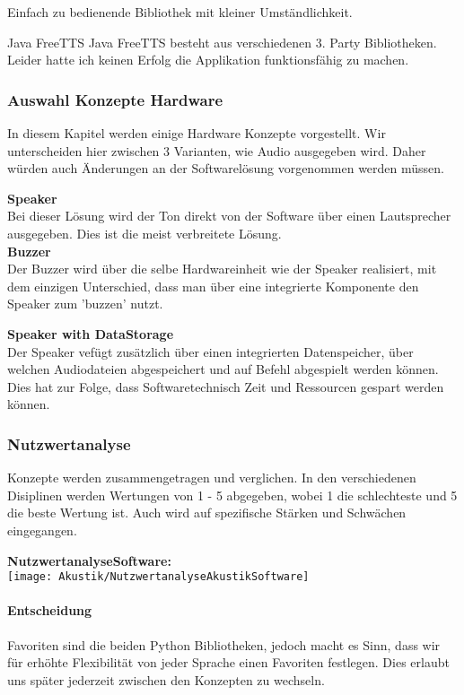 \documentclass[../../main.tex]{subfiles}
\begin{document}
    Einfach zu bedienende Bibliothek mit kleiner Umständlichkeit.

    \textbf{}{Java FreeTTS}
    Java FreeTTS besteht aus verschiedenen 3. Party Bibliotheken.
    Leider hatte ich keinen Erfolg die Applikation funktionsfähig zu machen.

    \subsubsection{Auswahl Konzepte Hardware}
    In diesem Kapitel werden einige Hardware Konzepte vorgestellt.
    Wir unterscheiden hier zwischen 3 Varianten, wie Audio ausgegeben wird.
    Daher würden auch Änderungen an der Softwarelösung vorgenommen werden müssen.

    \textbf{Speaker}\\
    Bei dieser Lösung wird der Ton direkt von der Software über einen Lautsprecher ausgegeben.
    Dies ist die meist verbreitete Lösung.\\

    \textbf{Buzzer}\\
    Der Buzzer wird über die selbe Hardwareinheit wie der Speaker realisiert, mit dem einzigen
    Unterschied, dass man über eine integrierte Komponente den Speaker zum 'buzzen' nutzt.

    \textbf{Speaker with DataStorage}\\
    Der Speaker vefügt zusätzlich über einen integrierten Datenspeicher, über welchen Audiodateien abgespeichert
    und auf Befehl abgespielt werden können. Dies hat zur Folge, dass Softwaretechnisch Zeit und Ressourcen gespart werden können.

    \subsubsection{Nutzwertanalyse}
    Konzepte werden zusammengetragen und verglichen.
    In den verschiedenen Disiplinen werden Wertungen von 1 - 5 abgegeben, wobei 1 die schlechteste und 5 die beste Wertung ist.
    Auch wird auf spezifische Stärken und Schwächen eingegangen.

    \textbf{NutzwertanalyseSoftware:}\\
    \texttt{[image: Akustik/NutzwertanalyseAkustikSoftware]}
    \paragraph{Entscheidung}
    Favoriten sind die beiden Python Bibliotheken, jedoch macht es Sinn, dass wir für erhöhte Flexibilität von jeder Sprache einen Favoriten festlegen. Dies erlaubt uns später jederzeit zwischen den Konzepten zu wechseln.
\end{document}
